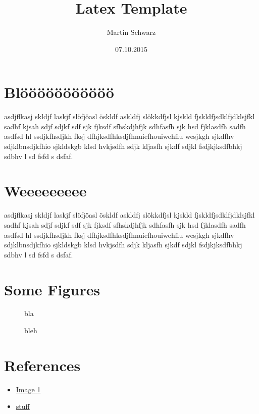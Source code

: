 \documentclass[a4paper, 12pt]{article}
\title{Latex Template}
\author{Martin Schwarz}
\date{07.10.2015}
\begin{document}
\maketitle

\renewcommand*{\contentsname}{Table of Contents}
\tableofcontents

\newpage

\section{Blööööööööööö}
asdjflkasj skldjf laskjf slöfjöasl öskldf askldfj slökkdfjsl kjskld fjskldfjsdklfjdklsjfkl sadhf kjsah sdjf sdjkf sdf sjk fjksdf sfhskdjhfjk sdhfasfh sjk hsd fjklasdfh sadfh asdfsd hl ssdjkfhsdjkh fksj dfhjksdfhksdjfhnuiefhouiwehfiu wesjkgh sjkdfhv sdjklbnsdjkfhio sjkldskgb klsd hvkjsdfh sdjk kljasfh sjkdf sdjkl fsdjkjksdfbhkj sdbhv l sd fsfd s dsfaf.

\section{Weeeeeeeee}
asdjflkasj skldjf laskjf slöfjöasl öskldf askldfj slökkdfjsl kjskld fjskldfjsdklfjdklsjfkl sadhf kjsah sdjf sdjkf sdf sjk fjksdf sfhskdjhfjk sdhfasfh sjk hsd fjklasdfh sadfh asdfsd hl ssdjkfhsdjkh fksj dfhjksdfhksdjfhnuiefhouiwehfiu wesjkgh sjkdfhv sdjklbnsdjkfhio sjkldskgb klsd hvkjsdfh sdjk kljasfh sjkdf sdjkl fsdjkjksdfbhkj sdbhv l sd fsfd s dsfaf.

\section{Some Figures}
\begin{figure}[H]
	\centering
	\caption{bla}
\end{figure}
\begin{figure}[H]
	\centering
	\caption{bleh}
\end{figure}

\section{References}
\begin{itemize}
	\item \href{http://foo.com}{Image 1}
	\item \href{http://bar.com}{stuff}
\end{itemize}
\end{document}
